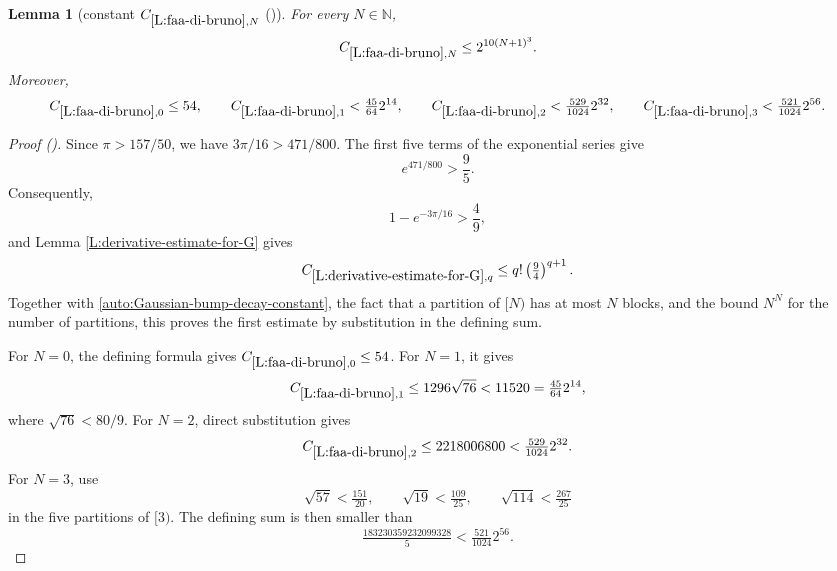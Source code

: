 \documentclass[12pt,reqno]{amsart}
\newcommand{\auto}{{({\tiny\faCar})}}
\theoremstyle{plain}
\newtheorem{lemma}[theorem]{Lemma}
\numberwithin{equation}{section}
\theoremstyle{remark}
\newcommand{\using}[1]{}
\newcommand{\N}{{\mathbb N}}
\begin{document}
\begin{lemma}[constant $C_{\ref{L:faa-di-bruno},N}$ \auto]\label{constant faa di bruno}\using{L:faa-di-bruno}\using{L:derivative-estimate-for-G}\using{Gaussian bump decay}
For every $N\in\N$,
\begin{equation}\label{constant faa di bruno bound}
C_{\ref{L:faa-di-bruno},N}\le2^{10(N+1)^3}.
\end{equation}
Moreover,
\begin{equation}\label{auto:constant-faa-di-bruno-small}
C_{\ref{L:faa-di-bruno},0}\le54,\qquad
C_{\ref{L:faa-di-bruno},1}<\tfrac{45}{64}2^{14},\qquad
C_{\ref{L:faa-di-bruno},2}<\tfrac{529}{1024}2^{32},\qquad
C_{\ref{L:faa-di-bruno},3}<\tfrac{521}{1024}2^{56}.
\end{equation}
\end{lemma}
\begin{proof}[Proof \auto]
Since $\pi>157/50$, we have $3\pi/16>471/800$. The first five terms of the exponential series give
\[
e^{471/800}>\frac95.
\]
Consequently,
\[
1-e^{-3\pi/16}>\frac49,
\]
and Lemma \ref{L:derivative-estimate-for-G} gives
\[
C_{\ref{L:derivative-estimate-for-G},q}
\le q!\left(\tfrac94\right)^{q+1}.
\]
Together with \eqref{auto:Gaussian-bump-decay-constant}, the fact that a partition of $[N)$ has at most $N$ blocks, and the bound $N^N$ for the number of partitions, this proves the first estimate by substitution in the defining sum.

For $N=0$, the defining formula gives $C_{\ref{L:faa-di-bruno},0}\le54$. For $N=1$, it gives
\[
C_{\ref{L:faa-di-bruno},1}
\le1296\sqrt{76}
<11520
=\tfrac{45}{64}2^{14},
\]
where $\sqrt{76}<80/9$. For $N=2$, direct substitution gives
\[
C_{\ref{L:faa-di-bruno},2}
\le2218006800
<\tfrac{529}{1024}2^{32}.
\]
For $N=3$, use
\[
\sqrt{57}<\tfrac{151}{20},
\qquad
\sqrt{19}<\tfrac{109}{25},
\qquad
\sqrt{114}<\tfrac{267}{25}
\]
in the five partitions of $[3)$. The defining sum is then smaller than
\[
\tfrac{183230359232099328}{5}
<\tfrac{521}{1024}2^{56}.
\]
\end{proof}
\end{document}
